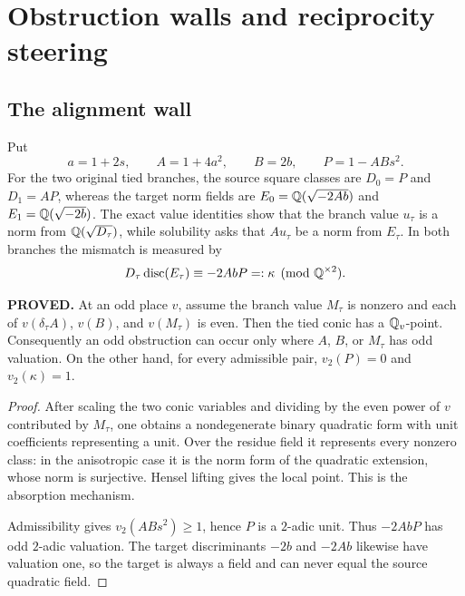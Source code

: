 \section{Obstruction walls and reciprocity steering}
\label{sec:walls}

\subsection{The alignment wall}

Put
\[
 a=1+2s,\qquad A=1+4a^2,\qquad B=2b,\qquad
 P=1-ABs^2.
\]
For the two original tied branches, the source square classes are
$D_0=P$ and $D_1=AP$, whereas the target norm fields are
$E_0=\mathbb{Q}(\sqrt{-2Ab})$ and $E_1=\mathbb{Q}(\sqrt{-2b})$.  The exact value
identities show that the branch value $u_\tau$ is a norm from
$\mathbb{Q}(\sqrt{D_\tau})$, while solubility asks that $Au_\tau$ be a norm
from $E_\tau$.  In both branches the mismatch is measured by
\[
 D_\tau\operatorname{disc}(E_\tau)
 \equiv -2AbP=:\kappa\pmod{\mathbb{Q}^{\times 2}}.
\]

\begin{proposition}
\textbf{PROVED.}  At an odd place $v$, assume the branch value
$M_\tau$ is nonzero and each of
$v(\delta_\tau A)$, $v(B)$, and $v(M_\tau)$ is even.  Then the tied
conic has a $\mathbb{Q}_v$-point.  Consequently an odd obstruction can occur
only where $A$, $B$, or $M_\tau$ has odd valuation.  On the other hand,
for every admissible pair, $v_2(P)=0$ and $v_2(\kappa)=1$.
\end{proposition}

\begin{proof}
After scaling the two conic variables and dividing by the even power
of $v$ contributed by $M_\tau$, one obtains a nondegenerate binary
quadratic form with unit coefficients representing a unit.  Over the
residue field it represents every nonzero class: in the anisotropic
case it is the norm form of the quadratic extension, whose norm is
surjective.  Hensel lifting gives the local point.  This is the
absorption mechanism.

Admissibility gives $v_2(ABs^2)\geq 1$, hence $P$ is a $2$-adic unit.
Thus $-2AbP$ has odd $2$-adic valuation.  The target discriminants
$-2b$ and $-2Ab$ likewise have valuation one, so the target is always
a field and can never equal the source quadratic field.
\end{proof}

